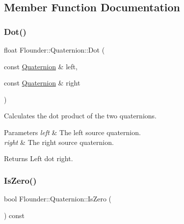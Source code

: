 \subsection{Member Function Documentation}
\mbox{\label{class_flounder_1_1_quaternion_a46e14d08030eabba2efd7ff6360c8db7}} 
\subsubsection{\texorpdfstring{Dot()}{Dot()}}
{\footnotesize\ttfamily float Flounder\+::\+Quaternion\+::\+Dot (\begin{DoxyParamCaption}\item[{const \hyperlink{class_flounder_1_1_quaternion}{Quaternion} \&}]{left,  }\item[{const \hyperlink{class_flounder_1_1_quaternion}{Quaternion} \&}]{right }\end{DoxyParamCaption})\hspace{0.3cm}{\ttfamily [static]}}



Calculates the dot product of the two quaternions. 


\begin{DoxyParams}{Parameters}
{\em left} & The left source quaternion. \\
\hline
{\em right} & The right source quaternion. \\
\hline
\end{DoxyParams}
\begin{DoxyReturn}{Returns}
Left dot right. 
\end{DoxyReturn}
\mbox{\label{class_flounder_1_1_quaternion_a73eb421d4ea51cc5aff973ebe19ad880}} 
\subsubsection{\texorpdfstring{Is\+Zero()}{IsZero()}}
{\footnotesize\ttfamily bool Flounder\+::\+Quaternion\+::\+Is\+Zero (\begin{DoxyParamCaption}{ }\end{DoxyParamCaption}) const}



